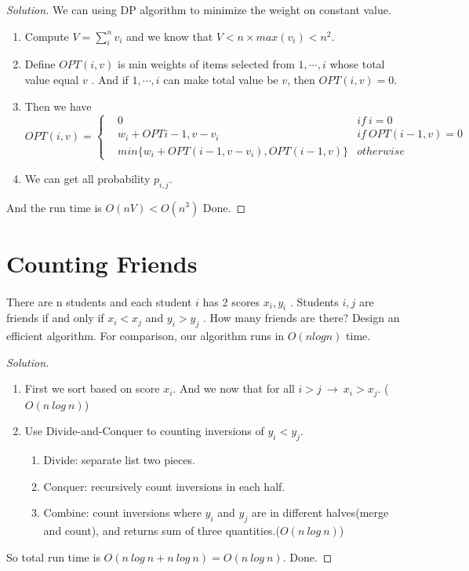 \documentclass[a4paper]{article}
\newenvironment{solution}
  {\renewcommand\qedsymbol{$\blacksquare$}\begin{proof}[Solution]}
  {\end{proof}}
\begin{document}
\begin{solution}We can using DP algorithm to minimize the weight on constant value.
  \begin{enumerate}[1)]
    \item Compute $V=\sum_{i}^{n}v_{i}$ and we know that $V<n\times max(v_{i})<n^{2}$.
    \item Define $OPT(i,v)$ is min weights of items selected from $1,\cdots,i$ whose total value equal $v$ . And if $1,\cdots,i$ can make total value be $v$, then $OPT(i,v)=0$.
    \item Then we have
    \begin{equation*}
      OPT(i,v)=\left\{
      \begin{aligned}
        &0 &if\  i=0\\
        &w_{i}+OPT{i-1,v-v_{i}} &if \ OPT(i-1,v)=0\\
        &min\{w_{i}+OPT(i-1,v-v_{i}),OPT(i-1,v)\} &otherwise
      \end{aligned}
      \right.
    \end{equation*}
    \item We can get all probability $p_{i,j}$.
  \end{enumerate}
  And the run time is $O(nV)<O(n^{3})$
  Done.
\end{solution}

\section*{Counting Friends}
\paragraph{}
There are n students and each student $i$ has 2 scores $x_{i} , y_{i}$ . Students $i, j$ are friends if and only if $x_{i} < x_{j}$
and $y_{i} > y_{j}$ . How many friends are there? Design an efficient algorithm. For comparison, our algorithm
runs in $O(nlog n)$ time.
\begin{solution}\
  \begin{enumerate}[1)]
    \item First we sort based on score $x_{i}$. And we now that for all $i>j\ \to\ x_{i}>x_{j}$. ($O(n\ log\ n)$)
    \item Use Divide-and-Conquer to counting inversions of $y_{i}<y_{j}$.
    \begin{enumerate}[(1)]
      \item Divide: separate list two pieces.
      \item Conquer: recursively count inversions in each half.
      \item Combine: count inversions where $y_{i}$ and $y_{j}$ are in different halves(merge and count), and returns sum of three quantities.($O(n\ log\ n)$)
    \end{enumerate}
  \end{enumerate}
  So total run time is $O(n\ log\ n+n\ log\  n)=O(n\ log\ n)$.
  Done.
\end{solution}
\end{document}
